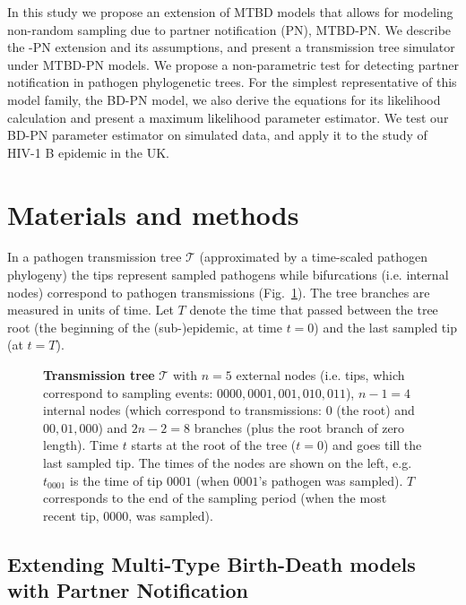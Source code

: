 \documentclass[10pt,letterpaper]{article}
\begin{document}
In this study we propose an extension of MTBD models that allows for modeling non-random sampling due to partner notification (PN), MTBD-PN. We describe the -PN extension and its assumptions, and present a transmission tree simulator under MTBD-PN models. We propose a non-parametric test for detecting partner notification in pathogen phylogenetic trees. For the simplest representative of this model family, the BD-PN model, we also derive the equations for its likelihood calculation and present a maximum likelihood parameter estimator. We test our BD-PN parameter estimator on simulated data, and apply it to the study of HIV-1 B epidemic in the UK. 

\section*{Materials and methods}
In a pathogen transmission tree $\mathscr{T}$ (approximated by a time-scaled pathogen phylogeny) the tips represent sampled pathogens %
while bifurcations (i.e. internal nodes) correspond to pathogen transmissions (Fig.~\ref{fig:tt}). The tree branches are measured in units of time. Let $T$ denote the time that passed between the tree root (the beginning of the (sub-)epidemic, at time $t=0$) and the last sampled tip (at $t=T$). 

\begin{figure}[!h]
\centering 

\caption{\textbf{Transmission tree} $\mathscr{T}$ with $n=5$ external nodes (i.e. tips, which correspond to sampling events: $0000, 0001, 001, 010, 011$), $n-1=4$ internal nodes (which correspond to transmissions: $0$ (the root) and $00, 01, 000$) and $2n - 2 = 8$ branches (plus the root branch of zero length). %
Time $t$ starts at the root of the tree ($t=0$) and goes till the last sampled tip. The times of the nodes are shown on the left, e.g. $t_{0001}$ is the time of tip $0001$ (when $0001$'s pathogen was sampled). $T$ corresponds to the end of the sampling period (when the most recent tip, $0000$, was sampled).}
\label{fig:tt} 
\end{figure}

\subsection*{Extending Multi-Type Birth-Death models with Partner Notification}
\end{document}
